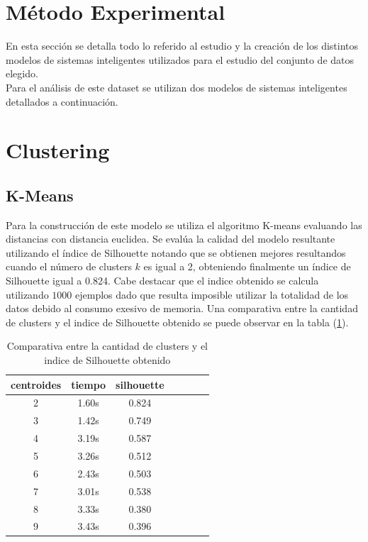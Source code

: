 \documentclass[osajnl,twocolumn,showpacs,superscriptaddress,10pt]{revtex4-1} %
\begin{document}
\section{Método Experimental} \label{section:experimental_method}

En esta sección se detalla todo lo referido al estudio y la creación de los distintos modelos de sistemas inteligentes utilizados para el estudio del conjunto de datos elegido. \\

Para el análisis de este dataset se utilizan dos modelos de sistemas inteligentes detallados a continuación. \\

\section{Clustering}

\subsection{K-Means}

Para la construcción de este modelo se utiliza el algoritmo K-means evaluando las distancias con distancia euclidea. Se evalúa la calidad del modelo resultante utilizando el índice de Silhouette notando que se obtienen mejores resultandos cuando el número de clusters $k$ es igual a 2, obteniendo finalmente un índice de Silhouette igual a 0.824. Cabe destacar que el indice obtenido se calcula utilizando $1000$ ejemplos dado que resulta imposible utilizar la totalidad de los datos debido al consumo exesivo de memoria. Una comparativa entre la cantidad de clusters y el indice de Silhouette obtenido se puede observar en la tabla (\ref{table:clusters_silhouette}). \\

\begin{table}[h!]
    \centering
    \begin{tabular}{ccccccc}
        centroides & tiempo & silhouette \\
        \hline
        2 & 1.60s	& 0.824 \\
        3 & 1.42s	& 0.749 \\
        4 & 3.19s	& 0.587 \\
        5 & 3.26s	& 0.512 \\
        6 & 2.43s	& 0.503 \\
        7 & 3.01s	& 0.538 \\
        8 & 3.33s	& 0.380 \\
        9 & 3.43s	& 0.396 \\
        \hline
    \end{tabular}
    \caption{Comparativa entre la cantidad de clusters y el indice de Silhouette obtenido}
    \label{table:clusters_silhouette}
\end{table}
\end{document}
